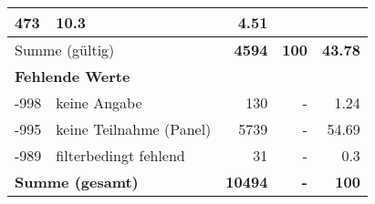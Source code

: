 \begin{longtable}{lXrrr}
       \num{473} &
       \num[round-mode=places,round-precision=2]{10.3} &
         \num[round-mode=places,round-precision=2]{4.51} \\
     \midrule
     \multicolumn{2}{l}{Summe (gültig)} &
       \textbf{\num{4594}} &
     \textbf{\num{100}} &
       \textbf{\num[round-mode=places,round-precision=2]{43.78}} \\
     \multicolumn{5}{l}{\textbf{Fehlende Werte}}\\
       -998 &
       keine Angabe &
         \num{130} &
        - &
         \num[round-mode=places,round-precision=2]{1.24} \\
       -995 &
       keine Teilnahme (Panel) &
         \num{5739} &
        - &
         \num[round-mode=places,round-precision=2]{54.69} \\
       -989 &
       filterbedingt fehlend &
         \num{31} &
        - &
         \num[round-mode=places,round-precision=2]{0.3} \\
     \midrule
     \multicolumn{2}{l}{\textbf{Summe (gesamt)}} &
          \textbf{\num{10494}} &
        \textbf{-} &
        \textbf{\num{100}} \\
     \bottomrule
     \end{longtable}
     
